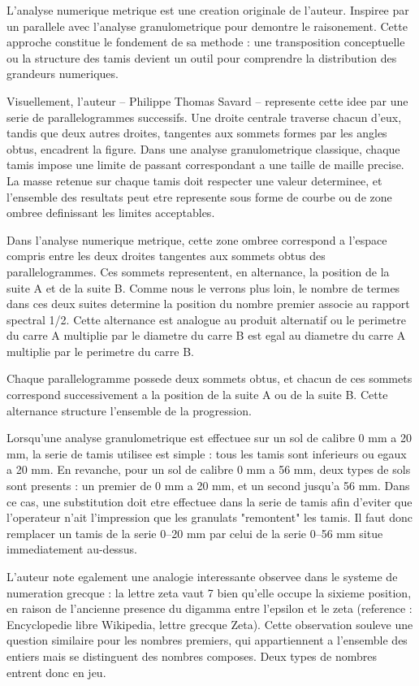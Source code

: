 \documentclass[a4paper,11pt]{article}
\newenvironment{resume}{%
    \begin{tcolorbox}[colback=purple!5,colframe=holpurple,title={\textbf{Résumé visuel}}]
}{%
    \end{tcolorbox}
}
\begin{document}
\begin{resume}
L'analyse numerique metrique est une creation originale de l'auteur. Inspiree par un parallele avec l'analyse granulometrique pour demontre le raisonement. Cette approche constitue le fondement de sa methode : une transposition conceptuelle ou la structure des tamis devient un outil pour comprendre la distribution des grandeurs numeriques.

Visuellement, l'auteur -- Philippe Thomas Savard -- represente cette idee par une serie de parallelogrammes successifs. Une droite centrale traverse chacun d'eux, tandis que deux autres droites, tangentes aux sommets formes par les angles obtus, encadrent la figure. Dans une analyse granulometrique classique, chaque tamis impose une limite de passant correspondant a une taille de maille precise. La masse retenue sur chaque tamis doit respecter une valeur determinee, et l'ensemble des resultats peut etre represente sous forme de courbe ou de zone ombree definissant les limites acceptables.

Dans l'analyse numerique metrique, cette zone ombree correspond a l'espace compris entre les deux droites tangentes aux sommets obtus des parallelogrammes. Ces sommets representent, en alternance, la position de la suite A et de la suite B. Comme nous le verrons plus loin, le nombre de termes dans ces deux suites determine la position du nombre premier associe au rapport spectral 1/2. Cette alternance est analogue au produit alternatif ou le perimetre du carre A multiplie par le diametre du carre B est egal au diametre du carre A multiplie par le perimetre du carre B.

Chaque parallelogramme possede deux sommets obtus, et chacun de ces sommets correspond successivement a la position de la suite A ou de la suite B. Cette alternance structure l'ensemble de la progression.

Lorsqu'une analyse granulometrique est effectuee sur un sol de calibre 0 mm a 20 mm, la serie de tamis utilisee est simple : tous les tamis sont inferieurs ou egaux a 20 mm. En revanche, pour un sol de calibre 0 mm a 56 mm, deux types de sols sont presents : un premier de 0 mm a 20 mm, et un second jusqu'a 56 mm. Dans ce cas, une substitution doit etre effectuee dans la serie de tamis afin d'eviter que l'operateur n'ait l'impression que les granulats "remontent" les tamis. Il faut donc remplacer un tamis de la serie 0--20 mm par celui de la serie 0--56 mm situe immediatement au-dessus.

L'auteur note egalement une analogie interessante observee dans le systeme de numeration grecque : la lettre zeta vaut 7 bien qu'elle occupe la sixieme position, en raison de l'ancienne presence du digamma entre l'epsilon et le zeta (reference : Encyclopedie libre Wikipedia, lettre grecque Zeta). Cette observation souleve une question similaire pour les nombres premiers, qui appartiennent a l'ensemble des entiers mais se distinguent des nombres composes. Deux types de nombres entrent donc en jeu.


\end{resume}
\end{document}
